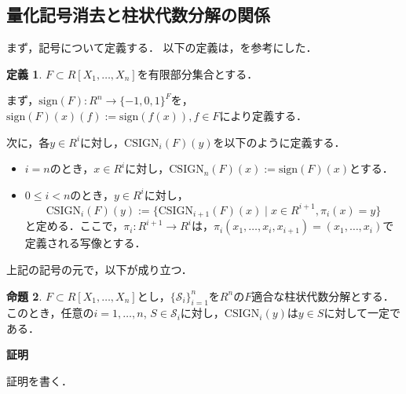 \documentclass[uplatex, dvipdfmx]{jsarticle}
\makeatletter
\numberwithin{equation}{section}
\renewenvironment{proof}[1][\proofname]{\par
  \pushQED{\qed}%
  \normalfont \topsep6\p@\@plus6\p@\relax
  \trivlist
  \item\relax
  {\bfseries
  #1\@addpunct{.}}\hspace\labelsep\ignorespaces
}{
  \popQED\endtrivlist\@endpefalse
}
\newcommand{\calS}{\mathcal{S}}
\newcommand{\sign}{\mathrm{sign}}
\newcommand{\CSIGN}{\mathrm{CSIGN}}
\newcommand{\map}[3]{{#1}\colon{#2}\rightarrow{#3}}
\theoremstyle{definition}
\newtheorem{definition}{定義}[section]
\newtheorem{proposition}[definition]{命題}
\renewcommand{\proofname}{\textbf{証明}}
\makeatother
\begin{document}
\subsection{量化記号消去と柱状代数分解の関係}
まず，記号について定義する．
以下の定義は，\cite[Notation 11.7.]{MR2248869}を参考にした．
\begin{definition}
     $F \subset R[X_1, \dots, X_n]$を有限部分集合とする．

     まず，$\map{\sign(F)}{R^n}{\{-1, 0, 1\}^F}$を，
     $\sign(F)(x)(f):= \sign(f(x)), f \in F$により定義する．

     次に，各$y \in R^i$に対し，$\CSIGN_i(F)(y)$を以下のように定義する．
     \begin{itemize}
          \item $i=n$のとき，$x \in R^i$に対し，$\CSIGN_n(F)(x):= \sign(F)(x) $とする．
          \item $0 \leq i<n$のとき，$y \in R^i$に対し，
          \begin{equation}
               \CSIGN_i(F)(y) := \{\CSIGN_{i+1}(F)(x) \mid x \in  R^{i+1}, \pi_i(x) = y\}
          \end{equation}
          と定める．ここで，$\map{\pi_i}{R^{i+1}}{R^i}$は，$\pi_i(x_1, \dots, x_i, x_{i+1}) = (x_1, \dots, x_i)$で定義される写像とする．
     \end{itemize}
\end{definition}

上記の記号の元で，以下が成り立つ．
\begin{proposition}
     $F \subset R[X_1, \dots, X_n]$とし，$\{\calS_i\}_{i=1}^n$を$R^n$の$F$適合な柱状代数分解とする．
     このとき，任意の$i=1, \dots, n$, $S \in \calS_i$に対し，$\CSIGN_i(y)$は$y \in S$に対して一定である．
\end{proposition}

\begin{proof}
     証明を書く．
\end{proof}

\end{document}
